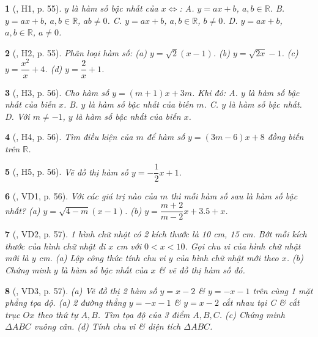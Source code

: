\documentclass{article}
\newtheorem{baitoan}{}
\begin{document}
\begin{baitoan}[\cite{Binh_boi_duong_Toan_9_tap_1}, H1, p. 55]
	$y$ là hàm số bậc nhất của $x\Leftrightarrow$: {\sf A.} $y = ax + b$, $a,b\in\mathbb{R}$. {\sf B.} $y = ax + b$, $a,b\in\mathbb{R}$, $ab\ne0$. {\sf C.} $y = ax + b$, $a,b\in\mathbb{R}$, $b\ne0$. {\sf D.} $y = ax + b$, $a,b\in\mathbb{R}$, $a\ne0$.
\end{baitoan}

\begin{baitoan}[\cite{Binh_boi_duong_Toan_9_tap_1}, H2, p. 55]
	Phân loại hàm số: (a) $y = \sqrt{2}(x - 1)$. (b) $y = \sqrt{2x} - 1$. (c) $y = \dfrac{x^2}{x} + 4$. (d) $y = \dfrac{2}{x} + 1$.
\end{baitoan}

\begin{baitoan}[\cite{Binh_boi_duong_Toan_9_tap_1}, H3, p. 56]
	Cho hàm số $y = (m + 1)x + 3m$. Khi đó: {\sf A.} $y$ là hàm số bậc nhất của biến $x$. {\sf B.} $y$ là hàm số bậc nhất của biến $m$. {\sf C.} $y$ là hàm số bậc nhất. {\sf D.} Với $m\ne-1$, $y$ là hàm số bậc nhất của biến $x$.
\end{baitoan}

\begin{baitoan}[\cite{Binh_boi_duong_Toan_9_tap_1}, H4, p. 56]
	Tìm điều kiện của $m$ để hàm số $y = (3m - 6)x + 8$ đồng biến trên $\mathbb{R}$.
\end{baitoan}

\begin{baitoan}[\cite{Binh_boi_duong_Toan_9_tap_1}, H5, p. 56]
	Vẽ đồ thị hàm số $y = -\dfrac{1}{2}x + 1$.
\end{baitoan}

\begin{baitoan}[\cite{Binh_boi_duong_Toan_9_tap_1}, VD1, p. 56]
	Với các giá trị nào của $m$ thì mỗi hàm số sau là hàm số bậc nhất? (a) $y = \sqrt{4 - m}(x - 1)$. (b) $y = \dfrac{m + 2}{m - 2}x + 3.5 + x$.
\end{baitoan}

\begin{baitoan}[\cite{Binh_boi_duong_Toan_9_tap_1}, VD2, p. 57]
	1 hình chữ nhật có 2 kích thước là {\rm10 cm, 15 cm}. Bớt mỗi kích thước của hình chữ nhật đi $x$ {\rm cm} với $0 < x < 10$. Gọi chu vi của hình chữ nhật mới là $y$ {\rm cm}. (a) Lập công thức tính chu vi $y$ của hình chữ nhật mới theo $x$. (b) Chứng minh $y$ là hàm số bậc nhất của $x$ \& vẽ đồ thị hàm số đó.
\end{baitoan}

\begin{baitoan}[\cite{Binh_boi_duong_Toan_9_tap_1}, VD3, p. 57]
	(a) Vẽ đồ thị 2 hàm số $y = x - 2$ \& $y = -x - 1$ trên cùng 1 mặt phẳng tọa độ. (a) 2 đường thẳng $y = -x - 1$ \& $y = x - 2$ cắt nhau tại C \& cắt trục $Ox$ theo thứ tự $A,B$. Tìm tọa độ của 3 điểm $A,B,C$. (c) Chứng minh $\Delta ABC$ vuông cân. (d) Tính chu vi \& diện tích $\Delta ABC$.
\end{baitoan}
\end{document}
